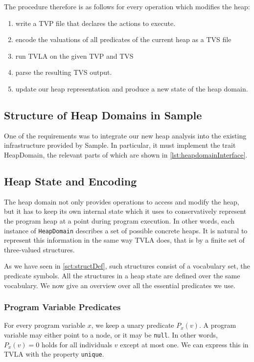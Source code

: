 \documentclass[11pt,a4paper,english]{article}
\begin{document}
The procedure therefore is as follows for every operation which modifies the heap:
\begin{enumerate}
  \item write a TVP file that declares the actions to
    execute.
  \item encode the valuations of all predicates of the current heap as a TVS file
  \item run TVLA on the given TVP and TVS 
  \item parse the resulting TVS output.
  \item update our heap representation and produce a new state of the heap domain.
\end{enumerate}

\subsection{Structure of Heap Domains in Sample}
One of the requirements was to integrate our new heap analysis into the existing
infrastructure provided by Sample. In particular, it must implement the trait
HeapDomain, the relevant parts of which are shown in
\autoref{lst:heapdomainInterface}.




\subsection{Heap State and Encoding}
\label{sct:heapState}
The heap domain not only provides operations to access and modify the heap, but
it has to keep its own internal state which it uses to conservatively represent
the program heap at a point during program execution. In other words, each
instance of \texttt{HeapDomain} describes a set of possible concrete heaps. It
is natural to represent this information in the same way TVLA does, that is by a
finite set of three-valued structures.

As we have seen in \autoref{sct:structDef}, such structures consist
of a vocabulary set, the predicate symbols. All the structures in a heap state
are defined over the same vocabulary. We now give an overview over all the
essential predicates we use. 

\subsubsection{Program Variable Predicates}
For every program variable $x$, we keep a unary predicate $P_x(v)$. A program
variable may either point to a node, or it may be \texttt{null}. In other words, 
$P_x(v) = 0$ holds for all individuals $v$ except at most one. We can
express this in TVLA with the property \texttt{unique}.
\end{document}
